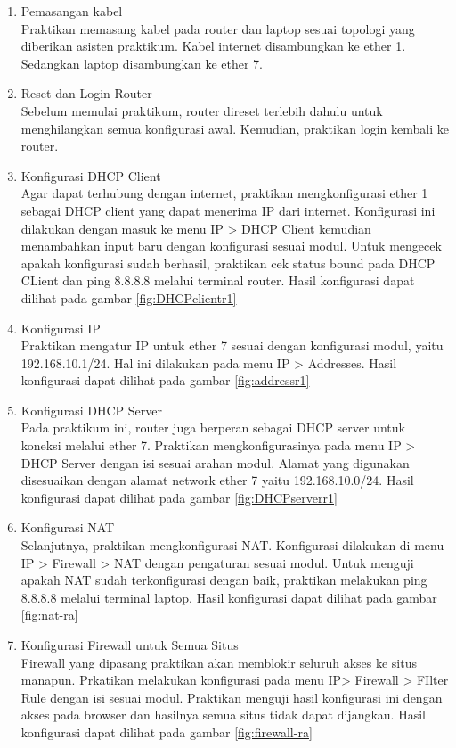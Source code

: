 \begin{enumerate}
  \item Pemasangan kabel \\
  Praktikan memasang kabel pada router dan laptop sesuai topologi yang diberikan asisten praktikum. Kabel internet disambungkan ke ether 1. Sedangkan laptop disambungkan ke ether 7.
  \item Reset dan Login Router \\
  Sebelum memulai praktikum, router direset terlebih dahulu untuk menghilangkan semua konfigurasi awal. Kemudian, praktikan login kembali ke router.
  \item Konfigurasi DHCP Client \\
  Agar dapat terhubung dengan internet, praktikan mengkonfigurasi ether 1 sebagai DHCP client yang dapat menerima IP dari internet. Konfigurasi ini dilakukan dengan masuk ke menu IP > DHCP Client kemudian menambahkan input baru dengan konfigurasi sesuai modul. Untuk mengecek apakah konfigurasi sudah berhasil, praktikan cek status bound pada DHCP CLient dan ping 8.8.8.8 melalui terminal router. Hasil konfigurasi dapat dilihat pada gambar \ref{fig:DHCPclientr1}
  \item Konfigurasi IP \\
  Praktikan mengatur IP untuk ether 7 sesuai dengan konfigurasi modul, yaitu 192.168.10.1/24. Hal ini dilakukan pada menu IP > Addresses. Hasil konfigurasi dapat dilihat pada gambar \ref{fig:addressr1}
  \item Konfigurasi DHCP Server \\
  Pada praktikum ini, router juga berperan sebagai DHCP server untuk koneksi melalui ether 7. Praktikan mengkonfigurasinya pada menu IP > DHCP Server dengan isi sesuai arahan modul. Alamat yang digunakan disesuaikan dengan alamat network ether 7 yaitu 192.168.10.0/24. Hasil konfigurasi dapat dilihat pada gambar \ref{fig:DHCPserverr1}
  \item Konfigurasi NAT \\
  Selanjutnya, praktikan mengkonfigurasi NAT. Konfigurasi dilakukan di menu IP > Firewall > NAT dengan pengaturan sesuai modul. Untuk menguji apakah NAT sudah terkonfigurasi dengan baik, praktikan melakukan ping 8.8.8.8 melalui terminal laptop. Hasil konfigurasi dapat dilihat pada gambar \ref{fig:nat-ra}
  \item Konfigurasi Firewall untuk Semua Situs\\
  Firewall yang dipasang praktikan akan memblokir seluruh akses ke situs manapun. Prkatikan melakukan konfigurasi pada menu IP> Firewall > FIlter Rule dengan isi sesuai modul. Praktikan menguji hasil konfigurasi ini dengan akses pada browser dan hasilnya semua situs tidak dapat dijangkau. Hasil konfigurasi dapat dilihat pada gambar \ref{fig:firewall-ra}

\end{enumerate}
